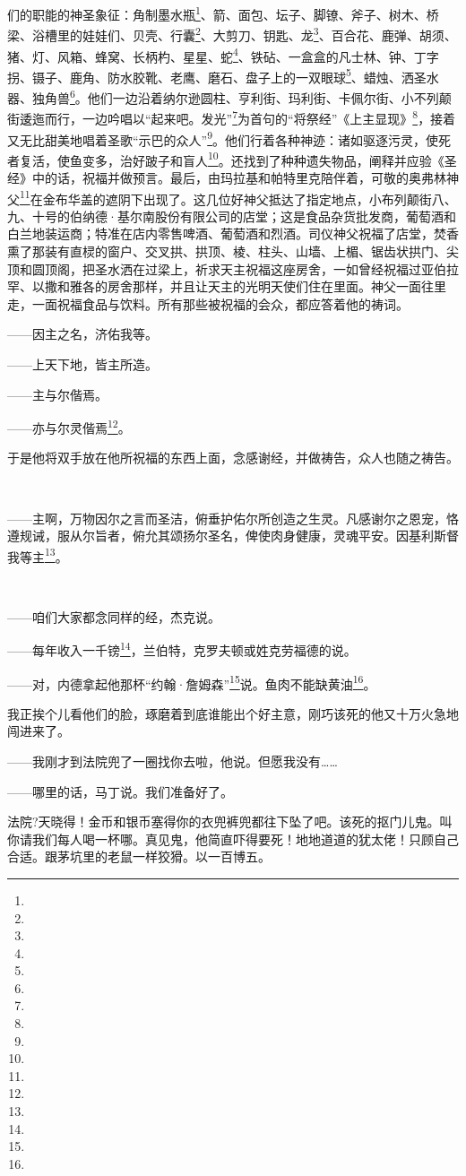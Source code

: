 们的职能的神圣象征：角制墨水瓶\footnote{}、箭、面包、坛子、脚镣、斧子、树木、桥梁、浴槽里的娃娃们、贝壳、行囊\footnote{}、大剪刀、钥匙、龙\footnote{}、百合花、鹿弹、胡须、猪、灯、风箱、蜂窝、长柄杓、星星、蛇\footnote{}、铁砧、一盒盒的凡士林、钟、丁字拐、镊子、鹿角、防水胶靴、老鹰、磨石、盘子上的一双眼球\footnote{}、蜡烛、洒圣水器、独角兽\footnote{}。他们一边沿着纳尔逊圆柱、亨利街、玛利街、卡佩尔街、小不列颠街逶迤而行，一边吟唱以“起来吧。发光”\footnote{}为首句的“将祭经”《上主显现》\footnote{}，接着又无比甜美地唱着圣歌“示巴的众人”\footnote{}。他们行着各种神迹：诸如驱逐污灵，使死者复活，使鱼变多，治好跛子和盲人\footnote{}。还找到了种种遗失物品，阐释并应验《圣经》中的话，祝福并做预言。最后，由玛拉基和帕特里克陪伴着，可敬的奥弗林神父\footnote{}在金布华盖的遮阴下出现了。这几位好神父抵达了指定地点，小布列颠街八、九、十号的伯纳德·基尔南股份有限公司的店堂；这是食品杂货批发商，葡萄酒和白兰地装运商；特准在店内零售啤酒、葡萄酒和烈酒。司仪神父祝福了店堂，焚香熏了那装有直棂的窗户、交叉拱、拱顶、棱、柱头、山墙、上楣、锯齿状拱门、尖顶和圆顶阁，把圣水洒在过梁上，祈求天主祝福这座房舍，一如曾经祝福过亚伯拉罕、以撒和雅各的房舍那样，并且让天主的光明天使们住在里面。神父一面往里走，一面祝福食品与饮料。所有那些被祝福的会众，都应答着他的祷词。
\par ——因主之名，济佑我等。
\par ——上天下地，皆主所造。
\par ——主与尔偕焉。
\par ——亦与尔灵偕焉\footnote{}。
\par 于是他将双手放在他所祝福的东西上面，念感谢经，并做祷告，众人也随之祷告。
\par  
\par ——主啊，万物因尔之言而圣洁，俯垂护佑尔所创造之生灵。凡感谢尔之恩宠，恪遵规诫，服从尔旨者，俯允其颂扬尔圣名，俾使肉身健康，灵魂平安。因基利斯督我等主\footnote{}。
\par  
\par ——咱们大家都念同样的经，杰克说。
\par ——每年收入一千镑\footnote{}，兰伯特，克罗夫顿或姓克劳福德的说。
\par ——对，内德拿起他那杯“约翰·詹姆森”\footnote{}说。鱼肉不能缺黄油\footnote{}。
\par 我正挨个儿看他们的脸，琢磨着到底谁能出个好主意，刚巧该死的他又十万火急地闯进来了。
\par ——我刚才到法院兜了一圈找你去啦，他说。但愿我没有……
\par ——哪里的话，马丁说。我们准备好了。
\par 法院?天晓得！金币和银币塞得你的衣兜裤兜都往下坠了吧。该死的抠门儿鬼。叫你请我们每人喝一杯哪。真见鬼，他简直吓得要死！地地道道的犹太佬！只顾自己合适。跟茅坑里的老鼠一样狡猾。以一百博五。
